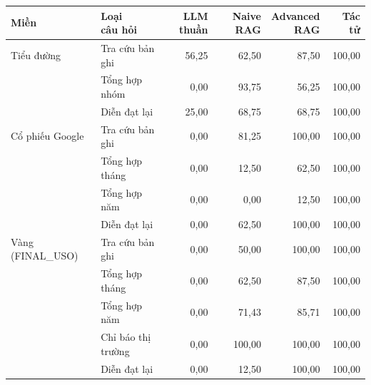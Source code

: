\begin{tabular}{llrrrr}
\toprule
Miền & \makecell[l]{Loại\\câu hỏi} & LLM thuần & Naive RAG & \makecell[r]{Advanced\\RAG} & Tác tử \\
\midrule
Tiểu đường & Tra cứu bản ghi & 56{,}25 & 62{,}50 & 87{,}50 & 100{,}00 \\
 & Tổng hợp nhóm & 0{,}00 & 93{,}75 & 56{,}25 & 100{,}00 \\
 & Diễn đạt lại & 25{,}00 & 68{,}75 & 68{,}75 & 100{,}00 \\
\midrule
Cổ phiếu Google & Tra cứu bản ghi & 0{,}00 & 81{,}25 & 100{,}00 & 100{,}00 \\
 & Tổng hợp tháng & 0{,}00 & 12{,}50 & 62{,}50 & 100{,}00 \\
 & Tổng hợp năm & 0{,}00 & 0{,}00 & 12{,}50 & 100{,}00 \\
 & Diễn đạt lại & 0{,}00 & 62{,}50 & 100{,}00 & 100{,}00 \\
\midrule
Vàng (FINAL\_USO) & Tra cứu bản ghi & 0{,}00 & 50{,}00 & 100{,}00 & 100{,}00 \\
 & Tổng hợp tháng & 0{,}00 & 62{,}50 & 87{,}50 & 100{,}00 \\
 & Tổng hợp năm & 0{,}00 & 71{,}43 & 85{,}71 & 100{,}00 \\
 & Chỉ báo thị trường & 0{,}00 & 100{,}00 & 100{,}00 & 100{,}00 \\
 & Diễn đạt lại & 0{,}00 & 12{,}50 & 100{,}00 & 100{,}00 \\
\bottomrule
\end{tabular}
